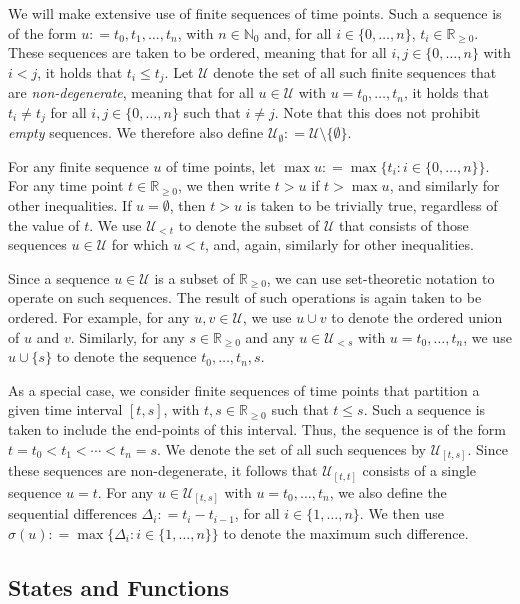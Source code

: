 \documentclass[10pt,a4paper]{paper}
\theoremstyle{definition}
\newcommand{\nats}{\mathbb{N}}
\newcommand{\natswith}{\nats_{0}}
\newcommand{\reals}{\mathbb{R}}
\newcommand{\realsnonneg}{\reals_{\geq 0}}
\newcommand{\coloneqq}{:\!=}
\begin{document}
We will make extensive use of finite sequences of time points. Such a sequence is of the form $u\coloneqq t_0,t_1,\ldots,t_n$, with $n\in\natswith$ and, for all $i\in\{0,\ldots,n\}$, $t_i\in\realsnonneg$. These sequences are taken to be ordered, meaning that for all $i,j\in\{0,\ldots,n\}$ with $i<j$, it holds that $t_i\leq t_j$. Let $\mathcal{U}$ denote the set of all such finite sequences that are \emph{non-degenerate}, meaning that for all $u\in\mathcal{U}$ with $u=t_0,\ldots,t_n$, it holds that $t_i\neq t_j$ for all $i,j\in\{0,\ldots,n\}$ such that $i\neq j$. Note that this does not prohibit \emph{empty} sequences. We therefore also define $\mathcal{U}_\emptyset\coloneqq \mathcal{U}\setminus\{\emptyset\}$.

For any finite sequence $u$ of time points, let $\max u\coloneqq \max\{t_i:i\in\{0,\ldots,n\}\}$. For any time point $t\in\realsnonneg$, we then write $t>u$ if $t>\max u$, and similarly for other inequalities. If $u=\emptyset$, then $t>u$ is taken to be trivially true, regardless of the value of $t$. We use $\mathcal{U}_{<t}$ to denote the subset of $\mathcal{U}$ that consists of those sequences $u\in\mathcal{U}$ for which $u<t$, and, again, similarly for other inequalities.

Since a sequence $u\in\mathcal{U}$ is a subset of $\realsnonneg$, we can use set-theoretic notation to operate on such sequences. The result of such operations is again taken to be ordered. For example, for any $u,v\in\mathcal{U}$, we use $u\cup v$ to denote the ordered union of $u$ and $v$. Similarly, for any $s\in\realsnonneg$ and any $u\in\mathcal{U}_{<s}$ with $u=t_0,\ldots,t_n$, we use $u\cup\{s\}$ to denote the sequence $t_0,\ldots,t_n,s$.

As a special case, we consider finite sequences of time points that partition a given time interval $[t,s]$, with $t,s\in\realsnonneg$ such that $t\leq s$. Such a sequence is taken to include the end-points of this interval.  Thus, the sequence is of the form $t=t_0< t_1<\cdots< t_n=s$. We denote the set of all such sequences by $\mathcal{U}_{[t,s]}$. Since these sequences are non-degenerate, it follows that $\mathcal{U}_{[t,t]}$ consists of a single sequence $u=t$. For any $u\in\mathcal{U}_{[t,s]}$ with $u=t_0,\ldots,t_n$, we also define the sequential differences $\Delta_i\coloneqq t_i-t_{i-1}$, for all $i\in\{1,\ldots,n\}$. We then use $\sigma(u)\coloneqq \max\{\Delta_i:i\in\{1,\ldots,n\}\}$ to denote the maximum such difference.

\subsection{States and Functions}\label{sec:multivar_notation}
\end{document}
